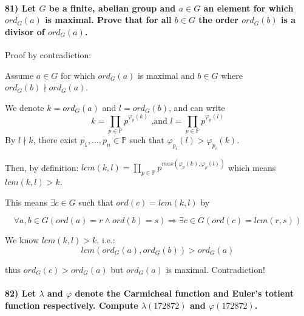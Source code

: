 \documentclass[
]{article}
\begin{document}
\hypertarget{let-g-be-a-finite-abelian-group-and-a-in-g-an-element-for-which-ord_ga-is-maximal.-prove-that-for-all-b-in-g-the-order-ord_gb-is-a-divisor-of-ord_ga.}{%
\paragraph{\texorpdfstring{81) Let \(G\) be a finite, abelian group and
\(a \in G\) an element for which \(ord_G(a)\) is maximal. Prove that for
all \(b \in G\) the order \(ord_G(b)\) is a divisor of
\(ord_G(a)\).}{81) Let G be a finite, abelian group and a \textbackslash in G an element for which ord\_G(a) is maximal. Prove that for all b \textbackslash in G the order ord\_G(b) is a divisor of ord\_G(a).}}\label{let-g-be-a-finite-abelian-group-and-a-in-g-an-element-for-which-ord_ga-is-maximal.-prove-that-for-all-b-in-g-the-order-ord_gb-is-a-divisor-of-ord_ga.}}

Proof by contradiction:

Assume \(a \in G\) for which \(ord_G(a)\) is maximal and \(b \in G\)
where \(ord_G(b) \nmid ord_G(a)\).

We denote \(k = ord_G(a)\) and \(l = ord_G(b)\), and can write \[
k = \prod_{p \in \mathbb{P}} p^{\varphi_p(k)} \text{ ,and } l = \prod_{p \in \mathbb{P}} p^{\varphi_p(l)}
\] By \(l \nmid k\), there exist \(p_1, \dots, p_n \in \mathbb{P}\) such
that \(\varphi_{p_i}(l) > \varphi_{p_i}(k)\).

Then, by definition:
\(lcm(k,l) = \prod_{p \in \mathbb{P}} p^{max(\varphi_p(k), \varphi_p (l))}\)
which means \(lcm(k,l)>k\).

This means \(\exists c \in G\) such that \(ord(c) = lcm(k,l)\) by

\[
\forall a,b \in G (ord(a) = r \land ord(b) = s) \Rightarrow \exists c \in G (ord(c) = lcm(r,s))
\]

We know \(lcm(k,l) > k\), i.e.: \[
lcm(ord_G(a), ord_G(b)) > ord_G(a)
\]

thus \(ord_G(c) > ord_G(a)\) but \(ord_G(a)\) is maximal. Contradiction!

\hypertarget{let-lambda-and-varphi-denote-the-carmicheal-function-and-eulers-totient-function-respectively.-compute-lambda172872-and-varphi172872.}{%
\paragraph{\texorpdfstring{82) Let \(\lambda\) and \(\varphi\) denote
the Carmicheal function and Euler's totient function respectively.
Compute \(\lambda(172872)\) and
\(\varphi(172872)\).}{82) Let \textbackslash lambda and \textbackslash varphi denote the Carmicheal function and Euler's totient function respectively. Compute \textbackslash lambda(172872) and \textbackslash varphi(172872).}}\label{let-lambda-and-varphi-denote-the-carmicheal-function-and-eulers-totient-function-respectively.-compute-lambda172872-and-varphi172872.}}
\end{document}
